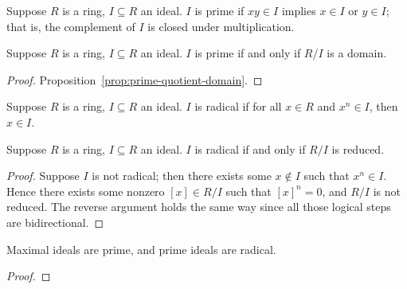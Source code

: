 \begin{definition}
    Suppose \(R\) is a ring, \(I \subseteq R\) an ideal.
    \(I\) is prime if \(xy \in I\) implies \(x \in I\) or \(y \in I\);
    that is, the complement of \(I\) is closed under multiplication.
\end{definition}
\begin{theorem}\label{thm:prime-quotient-domain}
    Suppose \(R\) is a ring, \(I \subseteq R\) an ideal.
    \(I\) is prime if and only if \(R/I\) is a domain.
\end{theorem}
\begin{proof}
    Proposition~\ref{prop:prime-quotient-domain}.
\end{proof}

\begin{definition}
    Suppose \(R\) is a ring, \(I \subseteq R\) an ideal.
    \(I\) is radical if for all \(x \in R\) and \(x^n \in I\), then \(x \in I\).
\end{definition}
\begin{theorem}\label{thm:radical-quotient-reduced}
    Suppose \(R\) is a ring, \(I \subseteq R\) an ideal.
    \(I\) is radical if and only if \(R/I\) is reduced.
\end{theorem}
\begin{proof}
    Suppose \(I\) is not radical;
    then there exists some \(x \notin I\) such that \(x^n \in I\).
    Hence there exists some nonzero \([x] \in R/I\) such that \([x]^n = 0\),
    and \(R/I\) is not reduced.
    The reverse argument holds the same way since all those logical steps are bidirectional.
\end{proof}

\begin{theorem}
    Maximal ideals are prime, and prime ideals are radical.
\end{theorem}
\begin{proof}
    
\end{proof}

